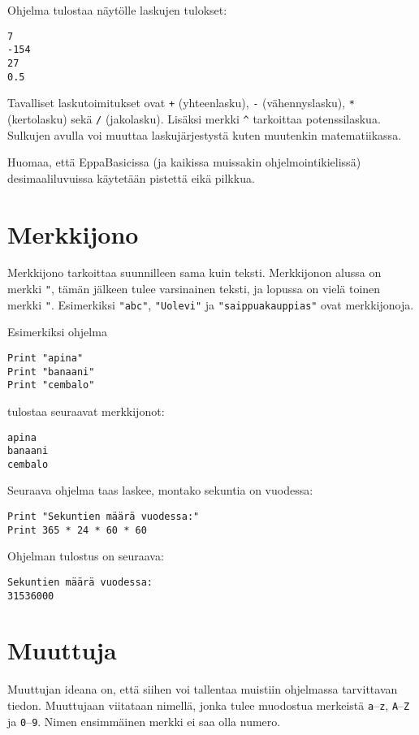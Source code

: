 \documentclass[oneside,11pt,a4paper,finnish]{book}
\begin{document}
Ohjelma tulostaa näytölle laskujen tulokset:

\begin{verbatim}
7
-154
27
0.5
\end{verbatim}

Tavalliset laskutoimitukset ovat \texttt{+} (yhteenlasku),
\texttt{-} (vähennyslasku), \texttt{*} (kertolasku)
sekä \texttt{/} (jakolasku).
Lisäksi merkki \texttt{\^} tarkoittaa potenssilaskua.
Sulkujen avulla voi muuttaa laskujärjestystä
kuten muutenkin matematiikassa.


Huomaa, että EppaBasicissa (ja kaikissa muissakin
ohjelmointikielissä) desimaaliluvuissa käytetään pistettä eikä pilkkua.

\newpage
\section{Merkkijono}

Merkkijono tarkoittaa suunnilleen sama kuin teksti.
Merkkijonon alussa on merkki \texttt{"},
tämän jälkeen tulee varsinainen teksti,
ja lopussa on vielä toinen merkki \texttt{"}.
Esimerkiksi \texttt{"abc"}, \texttt{"Uolevi"}
ja \texttt{"saippuakauppias"} ovat merkkijonoja.

Esimerkiksi ohjelma

\begin{verbatim}
Print "apina"
Print "banaani"
Print "cembalo"
\end{verbatim}

tulostaa seuraavat merkkijonot:

\begin{verbatim}
apina
banaani
cembalo
\end{verbatim}

Seuraava ohjelma taas laskee, montako sekuntia on vuodessa:

\begin{verbatim}
Print "Sekuntien määrä vuodessa:"
Print 365 * 24 * 60 * 60
\end{verbatim}

Ohjelman tulostus on seuraava:

\begin{verbatim}
Sekuntien määrä vuodessa:
31536000
\end{verbatim}

\section{Muuttuja}

Muuttujan ideana on, että siihen voi tallentaa
muistiin ohjelmassa tarvittavan tiedon.
Muuttujaan viitataan nimellä,
jonka tulee muodostua merkeistä \texttt{a}--\texttt{z}, \texttt{A}--\texttt{Z}
ja \texttt{0}--\texttt{9}. Nimen ensimmäinen merkki ei saa olla numero.
\end{document}
